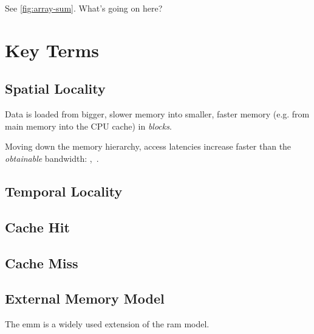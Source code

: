 \documentclass[a4paper]{scrartcl}
\begin{document}
See \cref{fig:array-sum}.  What's going on here?

\section{Key Terms}
\subsection{Spatial Locality}
Data is loaded from bigger, slower memory into smaller, faster memory (e.g. from main
memory into the CPU cache) in \emph{blocks}.

Moving down the memory hierarchy, access latencies increase faster than the
\emph{obtainable} bandwidth: ,~\cite[p.~2]{afmh}.

\subsection{Temporal Locality}

\subsection{Cache Hit}

\subsection{Cache Miss}

\subsection{External Memory Model}
The \gls{emm} is a widely used
extension of the \gls{ram} model.

\clearpage

\printglossary[type=\acronymtype] %

\printbibliography[heading=bibintoc]
\end{document}
